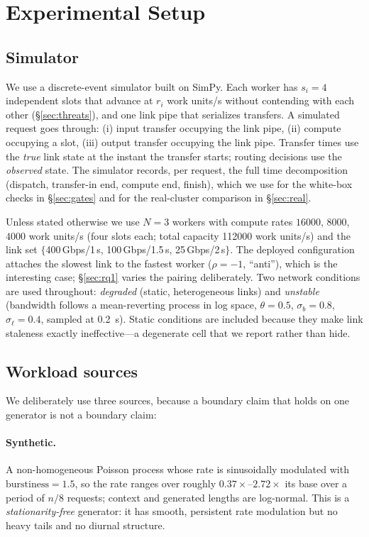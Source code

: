 \section{Experimental Setup}
\label{sec:setup}

\subsection{Simulator}
We use a discrete-event simulator built on SimPy. Each worker has $s_i=4$ independent slots that
advance at $r_i$ work units/s without contending with each other (\S\ref{sec:threats}), and one
link pipe that serializes transfers. A simulated request goes through: (i) input transfer
occupying the link pipe, (ii) compute occupying a slot, (iii) output transfer occupying the link
pipe. Transfer times use the \emph{true} link state at the instant the transfer starts; routing
decisions use the \emph{observed} state. The simulator records, per request, the full time
decomposition (dispatch, transfer-in end, compute end, finish), which we use for the white-box
checks in \S\ref{sec:gates} and for the real-cluster comparison in \S\ref{sec:real}.

Unless stated otherwise we use $N=3$ workers with compute rates $16000$, $8000$, $4000$ work
units/s (four slots each; total capacity \num{112000} work units/s) and the link set
$\{$400\,Gbps/1\,\textmu s, 100\,Gbps/1.5\,\textmu s, 25\,Gbps/2\,\textmu s$\}$. The deployed
configuration attaches the slowest link to the fastest worker ($\rho=-1$, ``anti''), which is the
interesting case; \S\ref{sec:rq1} varies the pairing deliberately. Two network conditions are used
throughout: \emph{degraded} (static, heterogeneous links) and \emph{unstable} (bandwidth follows a
mean-reverting process in log space, $\theta=0.5$, $\sigma_b=0.8$, $\sigma_\ell=0.4$, sampled at
\SI{0.2}{\second}). Static conditions are included because they make link staleness exactly
ineffective---a degenerate cell that we report rather than hide.

\subsection{Workload sources}
We deliberately use three sources, because a boundary claim that holds on one generator is not a
boundary claim:

\paragraph{Synthetic.} A non-homogeneous Poisson process whose rate is sinusoidally modulated
with $\text{burstiness}=1.5$, so the rate ranges over roughly $0.37\times$--$2.72\times$ its base
over a period of $n/8$ requests; context and generated lengths are log-normal. This is a
\emph{stationarity-free} generator: it has smooth, persistent rate modulation but no heavy tails
and no diurnal structure.

